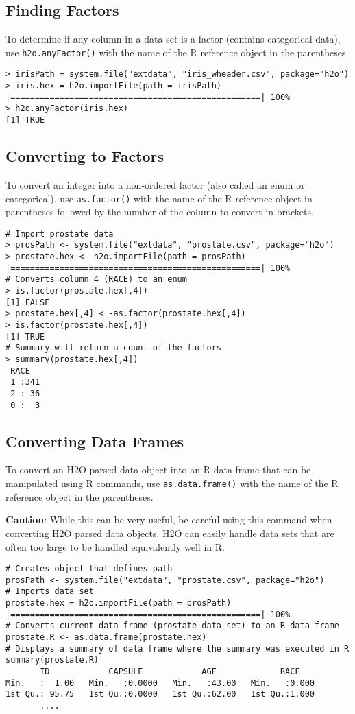 \subsection{Finding Factors}

To determine if any column in a data set is a factor (contains categorical data), use {\texttt{h2o.anyFactor()}} with the name of the R reference object in the parentheses.
\begin{lstlisting}[style=R]
> irisPath = system.file("extdata", "iris_wheader.csv", package="h2o")
> iris.hex = h2o.importFile(path = irisPath)
|===================================================| 100%
> h2o.anyFactor(iris.hex)
[1] TRUE
\end{lstlisting}

\subsection{Converting to Factors}
To convert an integer into a non-ordered factor (also called an enum or categorical), use {\texttt{as.factor()}} with the name of the R reference object in parentheses followed by the number of the column to convert in brackets.
\begin{lstlisting}[style=R]
# Import prostate data
> prosPath <- system.file("extdata", "prostate.csv", package="h2o")
> prostate.hex <- h2o.importFile(path = prosPath)
|===================================================| 100%
# Converts column 4 (RACE) to an enum
> is.factor(prostate.hex[,4])
[1] FALSE
> prostate.hex[,4] < -as.factor(prostate.hex[,4])
> is.factor(prostate.hex[,4])
[1] TRUE
# Summary will return a count of the factors
> summary(prostate.hex[,4])
 RACE   
 1 :341 
 2 : 36 
 0 :  3 
\end{lstlisting}
\subsection{Converting Data Frames}

To convert an H2O parsed data object into an R data frame that can be manipulated using R commands, use {\texttt{as.data.frame()}} with the name of the R reference object in the parentheses.

{\textbf{Caution}}: While this can be very useful, be careful using this command when converting H2O parsed data objects. H2O can easily handle data sets that are often too large to be handled equivalently well in R. 
\begin{lstlisting}[style=R]
# Creates object that defines path
prosPath <- system.file("extdata", "prostate.csv", package="h2o")
# Imports data set
prostate.hex = h2o.importFile(path = prosPath)
|===================================================| 100%
# Converts current data frame (prostate data set) to an R data frame
prostate.R <- as.data.frame(prostate.hex)
# Displays a summary of data frame where the summary was executed in R
summary(prostate.R) 
       ID            CAPSULE            AGE             RACE
Min.   :  1.00   Min.   :0.0000   Min.   :43.00   Min.   :0.000
1st Qu.: 95.75   1st Qu.:0.0000   1st Qu.:62.00   1st Qu.:1.000
       .... 
\end{lstlisting}


